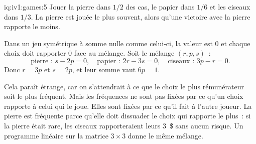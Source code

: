 \begin{solution}{iq:iv1:games:5}
Jouer la pierre dans $1/2$ des cas, le papier dans $1/6$ et les ciseaux dans $1/3$. La pierre est jouée le plus souvent, alors qu'une victoire avec la pierre rapporte le moins.

Dans un jeu symétrique à somme nulle comme celui-ci, la valeur est 0 et chaque choix doit rapporter 0 face au mélange. Soit le mélange $(r, p, s)$~:
\[
\text{pierre~: } s - 2p = 0, \quad \text{papier~: } 2r - 3s = 0, \quad \text{ciseaux~: } 3p - r = 0.
\]
Donc $r = 3p$ et $s = 2p$, et leur somme vaut $6p = 1$.

Cela paraît étrange, car on s'attendrait à ce que le choix le plus rémunérateur soit le plus fréquent. Mais les fréquences ne sont pas fixées par ce qu'un choix rapporte à celui qui le joue. Elles sont fixées par ce qu'il fait à l'autre joueur. La pierre est fréquente parce qu'elle doit dissuader le choix qui rapporte le plus~: si la pierre était rare, les ciseaux rapporteraient leurs 3~\$ sans aucun risque. Un programme linéaire sur la matrice $3 \times 3$ donne le même mélange.

\end{solution}

